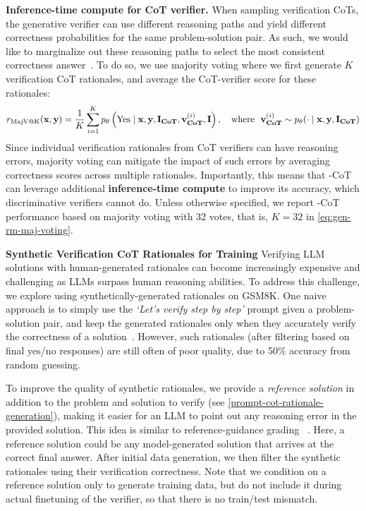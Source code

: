 \textbf{Inference-time compute for CoT verifier.} When sampling verification CoTs, the generative verifier can use different reasoning paths and yield different correctness probabilities for the same problem-solution pair. As such, we would like to marginalize out these reasoning paths to select the most consistent correctness answer~\citep{wang2022self}. To do so, we use majority voting where we first generate $K$ verification CoT rationales, and average the CoT-verifier score for these rationales:
\begin{equation}
    r_{\text{MajV@K}}({\mathbf{x}}, {\mathbf{y}}) = \dfrac{1}{K} \sum_{i=1}^{K} p_{\theta}\left(\text{Yes} \mid {\mathbf{x}}, {\mathbf{y}}, {\mathbf{I}}_\textbf{CoT}, {\mathbf{v}}_{\textbf{CoT}}^{(i)}, {\mathbf{I}}\right), \quad \text{where}\ \ {\mathbf{v}}_{\textbf{CoT}}^{(i)} \sim  p_{\theta}(\cdot \mid {\mathbf{x}}, {\mathbf{y}}, {\mathbf{I}}_\textbf{CoT}) \label{eq:gen-rm-maj-voting}
\end{equation}
Since individual verification rationales from CoT verifiers can have reasoning errors, majority voting can mitigate the impact of such errors by averaging correctness scores across multiple rationales. 
Importantly, this means that \genV-CoT can leverage additional \textbf{inference-time compute} 
to improve its accuracy, which discriminative verifiers cannot do. Unless otherwise specified, we report \genV-CoT performance based on majority voting with 32 votes, that is, $K=32$ in \eqref{eq:gen-rm-maj-voting}.

\textbf{Synthetic Verification CoT Rationales for Training}
Verifying LLM solutions with human-generated rationales can become increasingly expensive and challenging as LLMs surpass human reasoning abilities. To address this challenge, we explore using synthetically-generated rationales on GSM8K.
One naive approach is to simply use the \textit{`Let's verify step by step'} prompt given a problem-solution pair, and keep the generated rationales only when they accurately verify the correctness of a solution~\citep{singh2023beyond, zelikman2022star}. However, such rationales (after filtering based on final yes/no responses) are still often of poor quality, due to 50\% accuracy from random guessing. 

{To improve the quality of synthetic rationales, we provide a \textit{reference solution} in addition to the problem and solution to verify (see \autoref{prompt-cot-rationale-generation}), making it easier for an LLM to point out any reasoning error in the provided solution.} This idea is similar to reference-guidance grading ~\citep{zheng2024judging}. Here, a reference solution could be any model-generated solution that arrives at the correct final answer. After initial data generation, we then filter the synthetic rationales using their verification correctness. {Note that we condition on a reference solution only to generate training data, but do not include it during actual finetuning of the verifier, so that there is no train/test mismatch.}